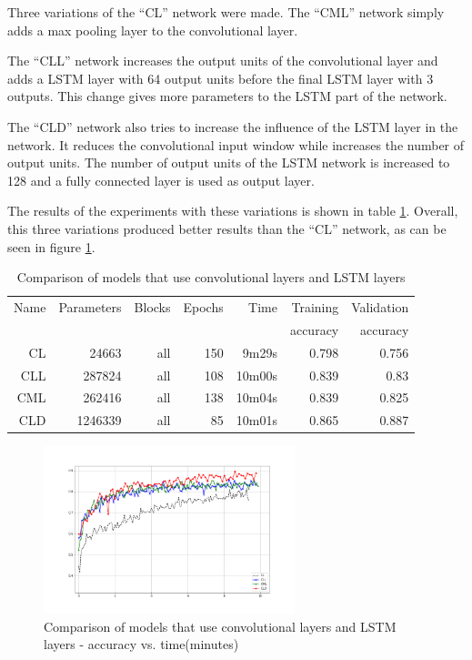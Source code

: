 
Three variations of the ``CL'' network were made.
The ``CML'' network simply adds a max pooling layer to the convolutional layer.

The ``CLL'' network increases the output units of the convolutional layer and adds a LSTM layer with 64 output units before the final LSTM layer with 3 outputs. This change gives more parameters to the LSTM part of the network.

The ``CLD'' network also tries to increase the influence of the LSTM layer in the network. It reduces the convolutional input window while increases the number of output units. The number of output units of the LSTM network is increased to 128 and a fully connected layer is used as output layer.

The results of the experiments with these variations is shown in table \ref{tab:carvingclvariations}.
Overall, this three variations produced better results than the ``CL'' network, as can be seen in figure \ref{fig:cl-variations}.

\begin{table}[!ht]
    \centering
    \caption[CL variations]{Comparison of models that use convolutional layers and LSTM layers}
    \label{tab:carvingclvariations}
\begin{tabular}{r|r|r|r|r|r|r}
\hline
Name & Parameters & Blocks & Epochs & Time    & Training          & Validation          \\       
     &            &        &        &         &          accuracy &            accuracy \\ \hline\hline

CL	    & 24663	    & all	& 150	& 9m29s	    & 0.798	& 0.756 \\\hline
CLL	    & 287824	& all	& 108	& 10m00s	& 0.839	& 0.83 \\\hline
CML	    & 262416	& all	& 138	& 10m04s	& 0.839	& 0.825 \\\hline
CLD	    & 1246339	& all	& 85	& 10m01s	& 0.865	& 0.887 \\\hline
\end{tabular}
\end{table}

\begin{figure}[htb!]
\centering\includegraphics[width=0.65\textwidth]{content/CL-CLL-CML-CLD.png}
\caption[CL variations]{\label{fig:cl-variations}Comparison of models that use convolutional layers and LSTM layers - accuracy vs. time(minutes)}%
\end{figure}
